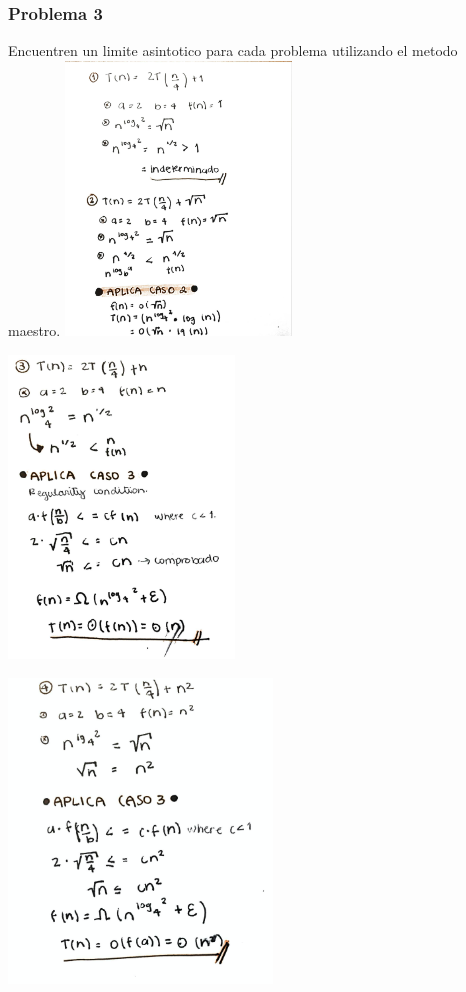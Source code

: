 \documentclass{beamer}
\begin{document}
\begin{frame}
\frametitle{Problema 3}
Encuentren un limite asintotico para cada problema utilizando el metodo maestro.
\newline
\includegraphics[width=6cm]{1.jpg}
\end{frame}
\begin{frame}
\includegraphics[width=6cm]{3.png}
\end{frame}
\begin{frame}
\includegraphics[width=7cm]{4.png}

\end{frame}
\end{document}
